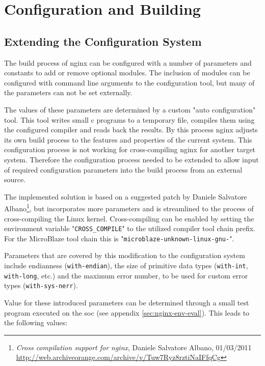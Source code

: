 \section{Configuration and Building}
\label{sec:nginx-config}

\subsection{Extending the Configuration System}

The build process of nginx can be configured with a number of parameters and constants to add or remove optional modules. The inclusion of modules can be configured with command line arguments to the configuration tool, but many of the parameters can not be set externally.

The values of these parameters are determined by a custom "auto configuration" tool. This tool writes small c programs to a temporary file, compiles them using the configured compiler and reads back the results. By this process nginx adjusts its own build process to the features and properties of the current system. This configuration process is not working for cross-compiling nginx for another target system. Therefore the configuration process needed to be extended to allow input of required configuration parameters into the build process from an external source.

The implemented solution is based on a suggested patch by Daniele Salvatore Albano\footnote{\textit{Cross compilation support for nginx}, Daniele Salvatore Albano, 01/03/2011 \url{http://web.archiveorange.com/archive/v/Tuw7Ryz8rztiNaIFfqCg}}, but incorporates more parameters and is streamlined to the process of cross-compiling the Linux kernel. Cross-compiling can be enabled by setting the environment variable "\texttt{CROSS\_COMPILE}" to the utilized compiler tool chain prefix. For the MicroBlaze tool chain this is "\texttt{microblaze-unknown-linux-gnu-}".

Parameters that are covered by this modification to the configuration system include endianness (\texttt{with-endian}), the size of primitive data types (\texttt{with-int}, \texttt{with-long}, etc.) and the maximum error number, to be used for custom error types (\texttt{with-sys-nerr}).

Value for these introduced parameters can be determined through a small test program executed on the \gls{soc} (see appendix \ref{sec:nginx-env-eval}). This leads to the following values:

